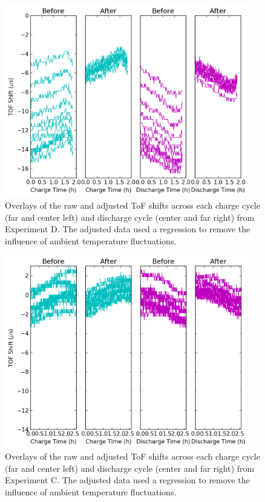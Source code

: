 \begin{figure}[h!]\label{fig:0417overlays}
\includegraphics[width=0.95\textwidth]{Thesis/0417overlays.png}
\centering
\caption{Overlays of the raw and adjusted ToF shifts across each charge cycle (far and center left) and discharge cycle (center and far right) from Experiment D. The adjusted data used a regression to remove the influence of ambient temperature fluctuations.}
\end{figure}

\begin{figure}[h!]\label{fig:0409overlays}
\includegraphics[width=0.95\textwidth]{Thesis/0409overlays.png}
\centering
\caption{Overlays of the raw and adjusted ToF shifts across each charge cycle (far and center left) and discharge cycle (center and far right) from Experiment C. The adjusted data used a regression to remove the influence of ambient temperature fluctuations.}
\end{figure}
